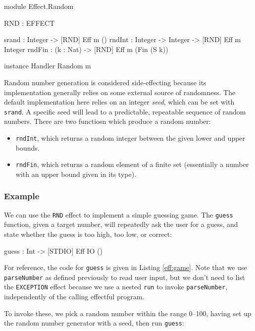 \begin{code}[float=h,frame=single,label=eff:random,caption={Random Number Effect}]
module Effect.Random

RND : EFFECT

srand  : Integer ->            { [RND] } Eff m ()
rndInt : Integer -> Integer -> { [RND] } Eff m Integer
rndFin : (k : Nat) ->          { [RND] } Eff m (Fin (S k))

instance Handler Random m
\end{code}

Random number generation is considered side-effecting because its implementation
generally relies on some external source of randomness. The default 
implementation here relies on an integer \emph{seed}, which can be set with
\texttt{srand}. A specific seed will lead to a predictable, repeatable
sequence of random numbers. There are two functiosn which produce a random
number:

\begin{itemize}
\item \texttt{rndInt}, which returns a random integer between the given lower and upper bounds.
\item \texttt{rndFin}, which returns a random element of a finite set (essentially
a number with an upper bound given in its type).
\end{itemize}

\subsubsection*{Example}

We can use the \texttt{RND} effect to implement a simple guessing game.
The \texttt{guess} function, given a target number, will repeatedly ask the
user for a guess, and state whether the guess is too high, too low, or
correct:

\begin{code}
guess : Int -> { [STDIO] } Eff IO ()
\end{code}

\noindent
For reference, the code for \texttt{guess} is given in Listing \ref{eff:game}.
Note that we use \texttt{parseNumber} as defined previously 
to read user input, but we don't need to list the \texttt{EXCEPTION} effect
because we use a nested \texttt{run} to invoke \texttt{parseNumber},
independently of the calling effectful program.

To invoke these, we pick a random number within the range 0--100, having
set up the random number generator with a seed, then run \texttt{guess}:


